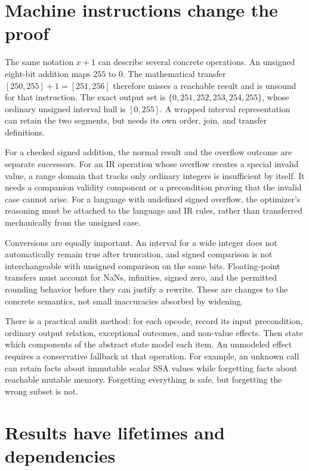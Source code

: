 \section{Machine instructions change the proof}
\label{sec:ch42-machine}

The same notation $x+1$ can describe several concrete operations.
An unsigned eight-bit addition maps $255$ to $0$.
The mathematical transfer $[250,255]+1=[251,256]$ therefore misses a reachable result and is unsound for that instruction.
The exact output set is $\{0,251,252,253,254,255\}$, whose ordinary unsigned interval hull is $[0,255]$.
A wrapped interval representation can retain the two segments, but needs its own order, join, and transfer definitions.

For a checked signed addition, the normal result and the overflow outcome are separate successors.
For an IR operation whose overflow creates a special invalid value, a range domain that tracks only ordinary integers is insufficient by itself.
It needs a companion validity component or a precondition proving that the invalid case cannot arise.
For a language with undefined signed overflow, the optimizer's reasoning must be attached to the language and IR rules, rather than transferred mechanically from the unsigned case.

Conversions are equally important.
An interval for a wide integer does not automatically remain true after truncation, and signed comparison is not interchangeable with unsigned comparison on the same bits.
Floating-point transfers must account for NaNs, infinities, signed zero, and the permitted rounding behavior before they can justify a rewrite.
These are changes to the concrete semantics, not small inaccuracies absorbed by widening.

There is a practical audit method: for each opcode, record its input precondition, ordinary output relation, exceptional outcomes, and non-value effects.
Then state which components of the abstract state model each item.
An unmodeled effect requires a conservative fallback at that operation.
For example, an unknown call can retain facts about immutable scalar SSA values while forgetting facts about reachable mutable memory.
Forgetting everything is safe, but forgetting the wrong subset is not.

\section{Results have lifetimes and dependencies}
\label{sec:ch42-invalidation}

